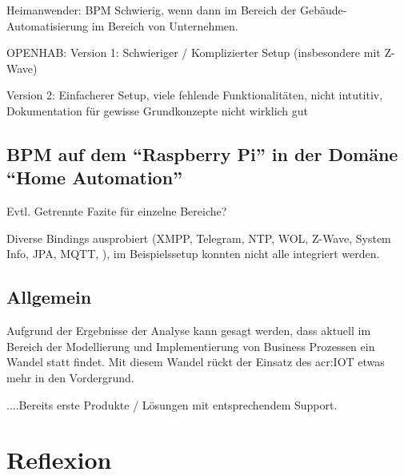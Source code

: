 Heimanwender: BPM Schwierig, wenn dann im Bereich der Gebäude-Automatisierung im Bereich von Unternehmen.


OPENHAB:
Version 1: Schwieriger / Komplizierter Setup (insbesondere mit Z-Wave)

Version 2: Einfacherer Setup, viele fehlende Funktionalitäten, nicht intutitiv, Dokumentation für gewisse Grundkonzepte nicht wirklich gut

\subsection{BPM auf dem "`Raspberry Pi"' in der Domäne "`Home Automation"'}\label{subsec:Fazit:BPMN:RPI:HA}
Evtl. Getrennte Fazite für einzelne Bereiche?

Diverse Bindings ausprobiert (XMPP, Telegram, NTP, WOL, Z-Wave, System Info, JPA, MQTT, ), im Beispielssetup konnten nicht alle integriert werden.

\subsection{Allgemein}
Aufgrund der Ergebnisse der Analyse kann gesagt werden, dass aktuell im Bereich der Modellierung und Implementierung von Business Prozessen ein Wandel statt findet. Mit diesem Wandel rückt der Einsatz des \gls{acr:IOT} etwas mehr in den Vordergrund. 

....Bereits erste Produkte / Lösungen mit entsprechendem Support.



\section{Reflexion}



